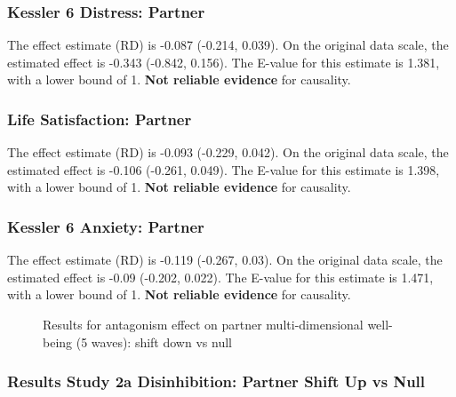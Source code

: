 \documentclass[
  singlecolumn]{article}
\begin{document}
\subsubsection{Kessler 6 Distress:
Partner}\label{kessler-6-distress-partner-10}

The effect estimate (RD) is -0.087 (-0.214, 0.039). On the original data
scale, the estimated effect is -0.343 (-0.842, 0.156). The E-value for
this estimate is 1.381, with a lower bound of 1. \textbf{Not reliable
evidence} for causality.

\subsubsection{Life Satisfaction:
Partner}\label{life-satisfaction-partner-10}

The effect estimate (RD) is -0.093 (-0.229, 0.042). On the original data
scale, the estimated effect is -0.106 (-0.261, 0.049). The E-value for
this estimate is 1.398, with a lower bound of 1. \textbf{Not reliable
evidence} for causality.

\subsubsection{Kessler 6 Anxiety:
Partner}\label{kessler-6-anxiety-partner-10}

The effect estimate (RD) is -0.119 (-0.267, 0.03). On the original data
scale, the estimated effect is -0.09 (-0.202, 0.022). The E-value for
this estimate is 1.471, with a lower bound of 1. \textbf{Not reliable
evidence} for causality.

\begin{figure}


\caption{\label{fig-results-antagonism-partner-down-long}Results for
antagonism effect on partner multi-dimensional well-being (5 waves):
shift down vs null}

\end{figure}%

\newpage{}

\subsubsection{Results Study 2a Disinhibition: Partner Shift Up vs
Null}\label{results-study-2a-disinhibition-partner-shift-up-vs-null}
\end{document}
